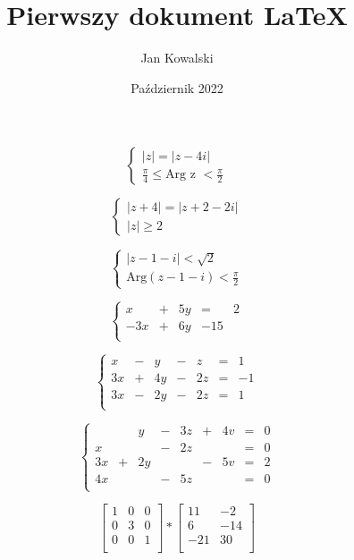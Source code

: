 \documentclass[12pt, letterpaper, titlepage]{article}
\title{Pierwszy dokument LaTeX}
\author{Jan Kowalski}
\date{Październik 2022}
\begin{document}
\maketitle



$$ \begin{cases}
|z| =|z-4i|\\
\frac{\pi}{4} \leq \textrm{Arg z } < \frac{\pi}{2} 
\end {cases}$$



$$ \begin{cases}
|z+4| =|z+2-2i|\\
|z|\geq 2
\end {cases}$$




$$ \begin{cases}
|z-1-i| <\sqrt 2 \\
\textrm{Arg}(z-1-i)< \frac{\pi}{2}
\end {cases}$$





$$  \left\{ \begin{array}{rrrrr}
x &+ & 5y & = & 2\\
-3x & + & 6y & -15\\
\end{array}
\right.$$



$$  \left\{ \begin{array}{rrrrrrr}
x &- & y & - & z&=& 1\\
3x & + & 4y & - & 2z &=&-1\\
3x & - & 2y & - & 2z &=& 1\\
\end{array}
\right.$$



$$  \left\{ \begin{array}{rrrrrrrrr}
 & & y &- & 3z & + & 4v & = & 0\\
x &  &  & - & 2z & & &=&0\\
3x &+  & 2y &  &  &- & 5v&=&2\\
4x & & & - & 5z & & &=&0\\
\end{array}
\right.$$




$$\mathbf{} 
\left[ \begin{array}{ccc}
1 & 0 & 0 \\
0 & 3 & 0 \\
0 & 0 & 1 \\
\end{array} \right]
*
\mathbf{} 
\left[ \begin{array}{cc}
11 & -2 \\
6 & -14 \\
-21 & 30 \\
\end{array} \right]$$
\end{document}
